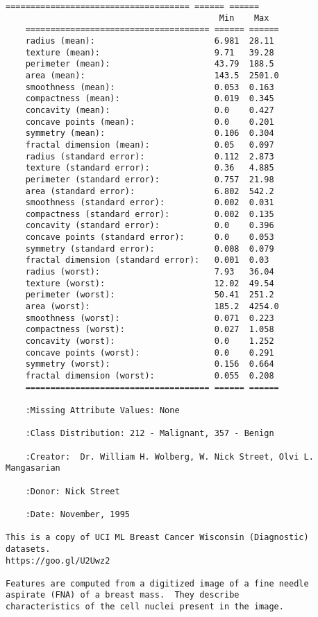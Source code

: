 \documentclass[11pt]{article}
\begin{document}
\begin{Verbatim}[commandchars=\\\{\}]
    ===================================== ====== ======
                                           Min    Max
    ===================================== ====== ======
    radius (mean):                        6.981  28.11
    texture (mean):                       9.71   39.28
    perimeter (mean):                     43.79  188.5
    area (mean):                          143.5  2501.0
    smoothness (mean):                    0.053  0.163
    compactness (mean):                   0.019  0.345
    concavity (mean):                     0.0    0.427
    concave points (mean):                0.0    0.201
    symmetry (mean):                      0.106  0.304
    fractal dimension (mean):             0.05   0.097
    radius (standard error):              0.112  2.873
    texture (standard error):             0.36   4.885
    perimeter (standard error):           0.757  21.98
    area (standard error):                6.802  542.2
    smoothness (standard error):          0.002  0.031
    compactness (standard error):         0.002  0.135
    concavity (standard error):           0.0    0.396
    concave points (standard error):      0.0    0.053
    symmetry (standard error):            0.008  0.079
    fractal dimension (standard error):   0.001  0.03
    radius (worst):                       7.93   36.04
    texture (worst):                      12.02  49.54
    perimeter (worst):                    50.41  251.2
    area (worst):                         185.2  4254.0
    smoothness (worst):                   0.071  0.223
    compactness (worst):                  0.027  1.058
    concavity (worst):                    0.0    1.252
    concave points (worst):               0.0    0.291
    symmetry (worst):                     0.156  0.664
    fractal dimension (worst):            0.055  0.208
    ===================================== ====== ======

    :Missing Attribute Values: None

    :Class Distribution: 212 - Malignant, 357 - Benign

    :Creator:  Dr. William H. Wolberg, W. Nick Street, Olvi L. Mangasarian

    :Donor: Nick Street

    :Date: November, 1995

This is a copy of UCI ML Breast Cancer Wisconsin (Diagnostic) datasets.
https://goo.gl/U2Uwz2

Features are computed from a digitized image of a fine needle
aspirate (FNA) of a breast mass.  They describe
characteristics of the cell nuclei present in the image.


\end{Verbatim}
\end{document}

